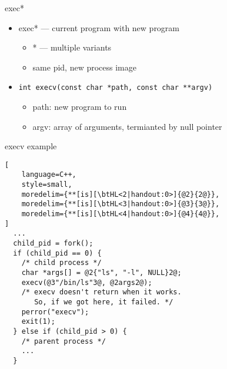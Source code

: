 \usetikzlibrary{matrix,patterns,arrows.meta,decorations.pathreplacing,shapes.misc,fit}

\begin{frame}{exec*}
\begin{itemize}
\item exec* ---  current program with new program
    \begin{itemize}
    \item * --- multiple variants
    \item same pid, new process image
    \end{itemize}
\item \texttt{int execv(const char *path, const char **argv)}
    \begin{itemize}
    \item path: new program to run
    \item argv: array of arguments, termianted by null pointer
    \end{itemize}
\end{itemize}
\end{frame}

\begin{frame}[fragile,label=execExample1]{execv example}
\begin{lstlisting}[
    language=C++,
    style=small,
    moredelim={**[is][\btHL<2|handout:0>]{@2}{2@}},
    moredelim={**[is][\btHL<3|handout:0>]{@3}{3@}},
    moredelim={**[is][\btHL<4|handout:0>]{@4}{4@}},
]
  ...
  child_pid = fork();
  if (child_pid == 0) {
    /* child process */
    char *args[] = @2{"ls", "-l", NULL}2@;
    execv(@3"/bin/ls"3@, @2args2@);
    /* execv doesn't return when it works.
       So, if we got here, it failed. */
    perror("execv");
    exit(1);
  } else if (child_pid > 0) {
    /* parent process */
    ...
  }
\end{lstlisting}
\end{frame}
